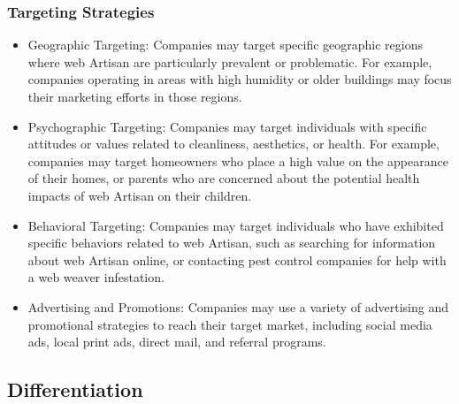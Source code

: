 \documentclass[12pt,a4paper]{article}
\begin{document}
\subsubsection{Targeting Strategies}
\begin{itemize}
    \item Geographic Targeting: Companies may target specific geographic regions where web Artisan are particularly prevalent or problematic. For example, companies operating in areas with high humidity or older buildings may focus their marketing efforts in those regions.
    \item Psychographic Targeting: Companies may target individuals with specific attitudes or values related to cleanliness, aesthetics, or health. For example, companies may target homeowners who place a high value on the appearance of their homes, or parents who are concerned about the potential health impacts of web Artisan on their children.
    \item Behavioral Targeting: Companies may target individuals who have exhibited specific behaviors related to web Artisan, such as searching for information about web Artisan online, or contacting pest control companies for help with a web weaver infestation.
    \item Advertising and Promotions: Companies may use a variety of advertising and promotional strategies to reach their target market, including social media ads, local print ads, direct mail, and referral programs.
\end{itemize}
\subsection{Differentiation}
\end{document}

